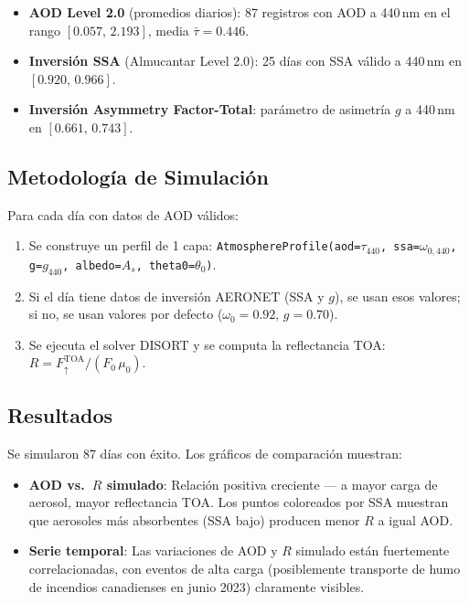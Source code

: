 \documentclass[a4paper,11pt]{article}
\begin{document}
\begin{itemize}
    \item \textbf{AOD Level 2.0} (promedios diarios): 87 registros con AOD
          a 440\,nm en el rango $[0.057,\, 2.193]$, media $\bar{\tau} = 0.446$.
    \item \textbf{Inversi\'on SSA} (Almucantar Level 2.0): 25 d\'ias con SSA v\'alido
          a 440\,nm en $[0.920,\, 0.966]$.
    \item \textbf{Inversi\'on Asymmetry Factor-Total}: par\'ametro de asimetr\'ia $g$
          a 440\,nm en $[0.661,\, 0.743]$.
\end{itemize}

\subsection{Metodolog\'ia de Simulaci\'on}

Para cada d\'ia con datos de AOD v\'alidos:
\begin{enumerate}
    \item Se construye un perfil de 1 capa: \texttt{AtmosphereProfile(aod=$\tau_{440}$,
          ssa=$\omega_{0,440}$, g=$g_{440}$, albedo=$A_s$, theta0=$\theta_0$)}.
    \item Si el d\'ia tiene datos de inversi\'on AERONET (SSA y $g$), se usan esos valores;
          si no, se usan valores por defecto ($\omega_0 = 0.92$, $g = 0.70$).
    \item Se ejecuta el solver DISORT y se computa la reflectancia TOA:
          $R = F_\uparrow^{\text{TOA}} / (F_0\,\mu_0)$.
\end{enumerate}

\subsection{Resultados}

Se simularon 87 d\'ias con \'exito. Los gr\'aficos de comparaci\'on muestran:
\begin{itemize}
    \item \textbf{AOD vs.\ $R$ simulado}: Relaci\'on positiva creciente ---
          a mayor carga de aerosol, mayor reflectancia TOA. Los puntos coloreados
          por SSA muestran que aerosoles m\'as absorbentes (SSA bajo) producen
          menor $R$ a igual AOD.
    \item \textbf{Serie temporal}: Las variaciones de AOD y $R$ simulado
          est\'an fuertemente correlacionadas, con eventos de alta carga
          (posiblemente transporte de humo de incendios canadienses en junio 2023)
          claramente visibles.
\end{itemize}
\end{document}
